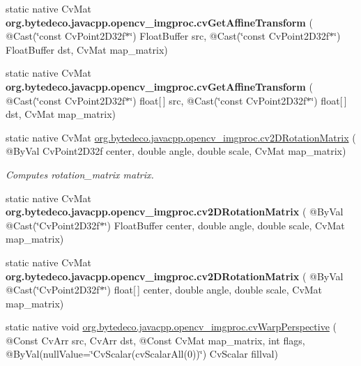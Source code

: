 \begin{DoxyCompactItemize}
\mbox{\label{group__imgproc__c_ga275f284178ff77721781a5b320e29e52}} 
static native Cv\+Mat {\bfseries org.\+bytedeco.\+javacpp.\+opencv\+\_\+imgproc.\+cv\+Get\+Affine\+Transform} ( @Cast(\char`\"{}const Cv\+Point2\+D32f$\ast$\char`\"{}) Float\+Buffer src, @Cast(\char`\"{}const Cv\+Point2\+D32f$\ast$\char`\"{}) Float\+Buffer dst, Cv\+Mat map\+\_\+matrix)
\item 
\mbox{\label{group__imgproc__c_ga563397d3557dbec38c1c2a66a368c6b5}} 
static native Cv\+Mat {\bfseries org.\+bytedeco.\+javacpp.\+opencv\+\_\+imgproc.\+cv\+Get\+Affine\+Transform} ( @Cast(\char`\"{}const Cv\+Point2\+D32f$\ast$\char`\"{}) float\mbox{[}$\,$\mbox{]} src, @Cast(\char`\"{}const Cv\+Point2\+D32f$\ast$\char`\"{}) float\mbox{[}$\,$\mbox{]} dst, Cv\+Mat map\+\_\+matrix)
\item 
static native Cv\+Mat \hyperlink{group__imgproc__c_ga8808b742ceec81dac792c107ef82fe13}{org.\+bytedeco.\+javacpp.\+opencv\+\_\+imgproc.\+cv2\+D\+Rotation\+Matrix} ( @By\+Val Cv\+Point2\+D32f center, double angle, double scale, Cv\+Mat map\+\_\+matrix)
\begin{DoxyCompactList}\small\item\em Computes rotation\+\_\+matrix matrix. \end{DoxyCompactList}\item 
\mbox{\label{group__imgproc__c_gaa79a33323f126e0f4926f42bb3afe003}} 
static native Cv\+Mat {\bfseries org.\+bytedeco.\+javacpp.\+opencv\+\_\+imgproc.\+cv2\+D\+Rotation\+Matrix} ( @By\+Val @Cast(\char`\"{}Cv\+Point2\+D32f$\ast$\char`\"{}) Float\+Buffer center, double angle, double scale, Cv\+Mat map\+\_\+matrix)
\item 
\mbox{\label{group__imgproc__c_ga69c8610ab404ff7daaed84619829f446}} 
static native Cv\+Mat {\bfseries org.\+bytedeco.\+javacpp.\+opencv\+\_\+imgproc.\+cv2\+D\+Rotation\+Matrix} ( @By\+Val @Cast(\char`\"{}Cv\+Point2\+D32f$\ast$\char`\"{}) float\mbox{[}$\,$\mbox{]} center, double angle, double scale, Cv\+Mat map\+\_\+matrix)
\item 
static native void \hyperlink{group__imgproc__c_ga77d2f4184f964c0a75b65d576b0fd417}{org.\+bytedeco.\+javacpp.\+opencv\+\_\+imgproc.\+cv\+Warp\+Perspective} ( @Const Cv\+Arr src, Cv\+Arr dst, @Const Cv\+Mat map\+\_\+matrix, int flags, @By\+Val(null\+Value=\char`\"{}Cv\+Scalar(cv\+Scalar\+All(0))\char`\"{}) Cv\+Scalar fillval)

\end{DoxyCompactItemize}
